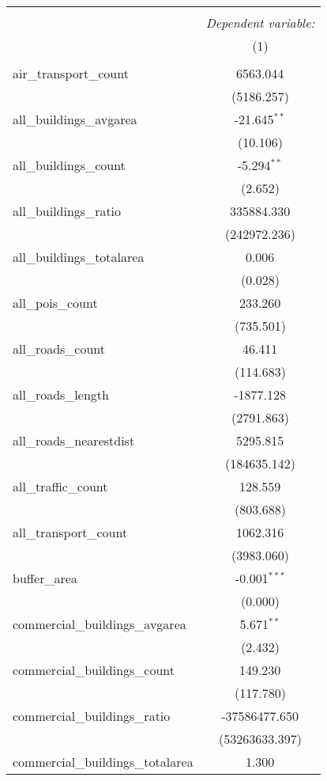 \begin{table}[!htbp] \centering
\begin{tabular}{@{\extracolsep{5pt}}lc}
\\[-1.8ex]\hline
\hline \\[-1.8ex]
& \multicolumn{1}{c}{\textit{Dependent variable:}} \
\cr \cline{1-2}
\\[-1.8ex] & (1) \\
\hline \\[-1.8ex]
 air_transport_count & 6563.044$^{}$ \\
  & (5186.257) \\
 all_buildings_avgarea & -21.645$^{**}$ \\
  & (10.106) \\
 all_buildings_count & -5.294$^{**}$ \\
  & (2.652) \\
 all_buildings_ratio & 335884.330$^{}$ \\
  & (242972.236) \\
 all_buildings_totalarea & 0.006$^{}$ \\
  & (0.028) \\
 all_pois_count & 233.260$^{}$ \\
  & (735.501) \\
 all_roads_count & 46.411$^{}$ \\
  & (114.683) \\
 all_roads_length & -1877.128$^{}$ \\
  & (2791.863) \\
 all_roads_nearestdist & 5295.815$^{}$ \\
  & (184635.142) \\
 all_traffic_count & 128.559$^{}$ \\
  & (803.688) \\
 all_transport_count & 1062.316$^{}$ \\
  & (3983.060) \\
 buffer_area & -0.001$^{***}$ \\
  & (0.000) \\
 commercial_buildings_avgarea & 5.671$^{**}$ \\
  & (2.432) \\
 commercial_buildings_count & 149.230$^{}$ \\
  & (117.780) \\
 commercial_buildings_ratio & -37586477.650$^{}$ \\
  & (53263633.397) \\
 commercial_buildings_totalarea & 1.300$^{}$ \\

\end{tabular}
\end{table}
